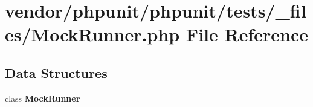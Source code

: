 \section{vendor/phpunit/phpunit/tests/\+\_\+files/\+Mock\+Runner.php File Reference}
\label{_mock_runner_8php}
\subsection*{Data Structures}
\begin{DoxyCompactItemize}
\item 
class {\bf Mock\+Runner}
\end{DoxyCompactItemize}
